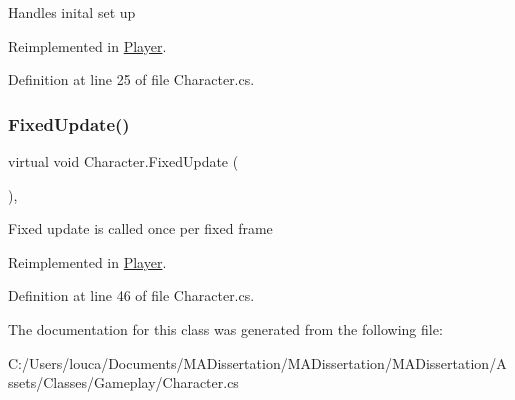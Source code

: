 Handles inital set up 



Reimplemented in \mbox{\hyperlink{class_player_a21d9f4bbd86a4a1aaa8844917270aefb}{Player}}.



Definition at line 25 of file Character.\+cs.

\mbox{\label{class_character_ad90105ab5e234884e5bca7ce5bd2c50e}} 
\subsubsection{\texorpdfstring{Fixed\+Update()}{FixedUpdate()}}
{\footnotesize\ttfamily virtual void Character.\+Fixed\+Update (\begin{DoxyParamCaption}{ }\end{DoxyParamCaption})\hspace{0.3cm}{\ttfamily [protected]}, {\ttfamily [virtual]}}



Fixed update is called once per fixed frame 



Reimplemented in \mbox{\hyperlink{class_player_a9f719f4557355ff498cc7ff6d3723a84}{Player}}.



Definition at line 46 of file Character.\+cs.



The documentation for this class was generated from the following file\+:\begin{DoxyCompactItemize}
\item 
C\+:/\+Users/louca/\+Documents/\+M\+A\+Dissertation/\+M\+A\+Dissertation/\+M\+A\+Dissertation/\+Assets/\+Classes/\+Gameplay/Character.\+cs\end{DoxyCompactItemize}

